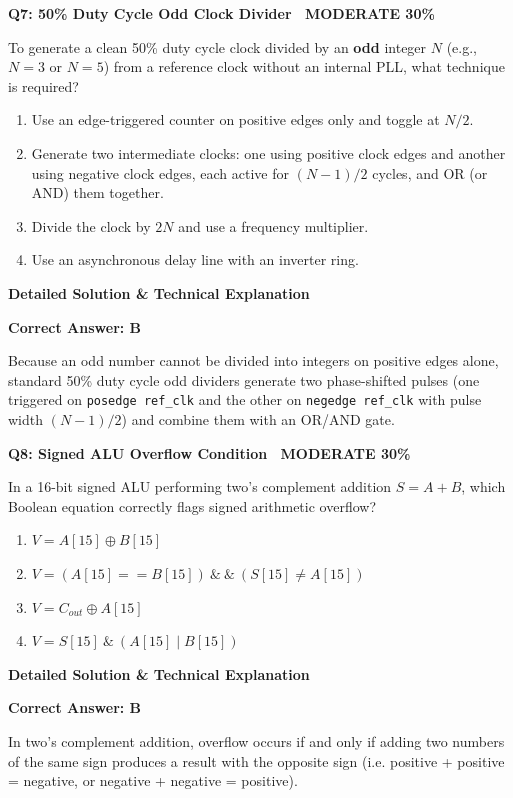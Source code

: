 \documentclass[11pt,a4paper]{article}
\newcommand{\badgemod}{{\color{white}\colorbox{modoran}{\bfseries\sffamily\tiny\ MODERATE 30\%\ }}}
\newenvironment{qbox}[2]{%
  \begin{mdframed}[style=qstyle]%
  {\bfseries\sffamily\color{primaryblue}#1 \hfill #2}\par\vspace{2pt}%
}{%
  \end{mdframed}%
}
\newenvironment{ansbox}{%
  \begin{mdframed}[style=ansstyle]%
  {\bfseries\sffamily\color{ansgreen}\small Detailed Solution \& Technical Explanation}\par\vspace{2pt}\small%
}{%
  \end{mdframed}%
}
\begin{document}
\begin{qbox}{Q7: 50\% Duty Cycle Odd Clock Divider}{\badgemod}
To generate a clean 50\% duty cycle clock divided by an \textbf{odd} integer $N$ (e.g., $N=3$ or $N=5$) from a reference clock without an internal PLL, what technique is required?
\begin{enumerate}[label=\textbf{\Alph*.}]
  \item Use an edge-triggered counter on positive edges only and toggle at $N/2$.
  \item Generate two intermediate clocks: one using positive clock edges and another using negative clock edges, each active for $(N-1)/2$ cycles, and OR (or AND) them together.
  \item Divide the clock by $2N$ and use a frequency multiplier.
  \item Use an asynchronous delay line with an inverter ring.
\end{enumerate}
\end{qbox}
\begin{ansbox}
\textbf{Correct Answer: B}

Because an odd number cannot be divided into integers on positive edges alone, standard 50\% duty cycle odd dividers generate two phase-shifted pulses (one triggered on \texttt{posedge ref\_clk} and the other on \texttt{negedge ref\_clk} with pulse width $(N-1)/2$) and combine them with an OR/AND gate.
\end{ansbox}

\begin{qbox}{Q8: Signed ALU Overflow Condition}{\badgemod}
In a 16-bit signed ALU performing two's complement addition $S = A + B$, which Boolean equation correctly flags signed arithmetic overflow?
\begin{enumerate}[label=\textbf{\Alph*.}]
  \item $V = A[15] \oplus B[15]$
  \item $V = (A[15] == B[15]) \ \&\ \&\ (S[15] \ne A[15])$
  \item $V = C_{out} \oplus A[15]$
  \item $V = S[15] \ \&\ (A[15] \mid B[15])$
\end{enumerate}
\end{qbox}
\begin{ansbox}
\textbf{Correct Answer: B}

In two's complement addition, overflow occurs if and only if adding two numbers of the same sign produces a result with the opposite sign (i.e. positive + positive = negative, or negative + negative = positive).
\end{ansbox}
\end{document}
